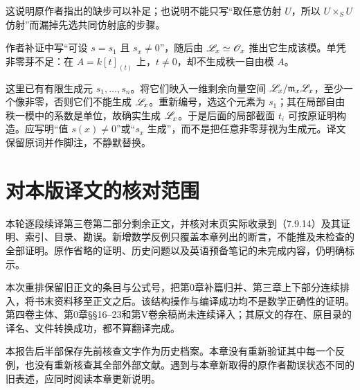 这说明原作者指出的缺步可以补足；也说明不能只写“取任意仿射 $U$，所以 $U\times_SU$ 仿射”而漏掉先选共同仿射底的步骤。

作者补证中写“可设 $s=s_1$ 且 $s_x\ne0$”，随后由 $\mathscr L_x\simeq\mathscr O_x$ 推出它生成该模。单凭非零芽不足：在 $A=k[t]_{(t)}$ 上，$t\ne0$，却不生成秩一自由模 $A$。

这里已有有限生成元 $s_1,\ldots,s_n$。将它们映入一维剩余向量空间 $\mathscr L_x/\mathfrak m_x\mathscr L_x$，至少一个像非零，否则它们不能生成 $\mathscr L_x$。重新编号，选这个元素为 $s_1$；其在局部自由秩一模中的系数是单位，故确实生成 $\mathscr L_x$。于是后面的局部截面 $t_i$ 可按原证明构造。应写明“值 $s(x)\ne0$”或“$s_x$ 生成”，而不是把任意非零芽视为生成元。译文保留原词并作脚注，不静默替换。

\section*{对本版译文的核对范围}
本轮逐段续译第三卷第二部分剩余正文，并核对末页实际收录到（7.9.14）及其证明、索引、目录、勘误。新增数学反例只覆盖本章列出的断言，不能推及未检查的全部证明。原作省略的证明、历史问题以及英语预备笔记的未完成内容，仍明确标示。

本次重排保留旧正文的条目与公式号，把第0章补篇归并、第三章上下部分连续排入，将书末资料移至正文之后。该结构操作与编译成功均不是数学正确性的证明。第四卷主体、第0章§§16--23和第V卷余稿尚未连续译入；其原文的存在、原目录的译名、文件转换成功，都不算翻译完成。

本报告后半部保存先前核查文字作为历史档案。本章没有重新验证其中每一个反例，也没有重新核查其全部外部文献。遇到与本章新取得的原作者勘误状态不同的旧表述，应同时阅读本章更新说明。

